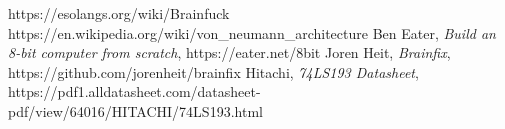 \begin{thebibliography}{99}
 https://esolangs.org/wiki/Brainfuck
 https://en.wikipedia.org/wiki/von\_neumann\_architecture
 Ben Eater, \emph{Build an 8-bit computer from scratch}, https://eater.net/8bit
 Joren Heit, \emph{Brainfix}, https://github.com/jorenheit/brainfix
 Hitachi, \emph{74LS193 Datasheet}, https://pdf1.alldatasheet.com/datasheet-pdf/view/64016/HITACHI/74LS193.html
\end{thebibliography}

